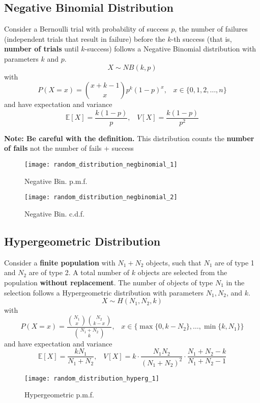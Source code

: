 \subsection{Negative Binomial Distribution}
Consider a Bernoulli trial with probability of success $p$, the number of failures (independent trials that result in failure) before the $k$-th success 
(that is, \textbf{number of trials} until $k$-success) follows a Negative Binomial distribution with parameters $k$ and $p$.
\[ X \sim NB(k,p)\]
with
\[ P(X=x) = \binom{x+k-1}{x} p^k(1-p)^x,\;\;\; x \in \{0,1,2,\dots,n\} \]
and have expectation and variance
\[ \mathbb{E}[X] = \frac{k(1-p)}{p},\;\;\; V[X] = \frac{k(1-p)}{p^2} \]

\textbf{Note: Be careful with the definition.} This distribution counts the \textbf{number of fails} not the number of fails + success
 
\begin{figure}[!ht]
    \begin{minipage}{0.45\linewidth}
      \texttt{[image: random\_distribution\_negbinomial\_1]}
      \caption{Negative Bin. p.m.f.}
    \end{minipage}
    \hfill
    \begin{minipage}{0.45\linewidth}
      \texttt{[image: random\_distribution\_negbinomial\_2]}
      \caption{Negative Bin. c.d.f.}
    \end{minipage}
\end{figure}

\subsection{Hypergeometric Distribution}
Consider a \textbf{finite population} with $N_1+N_2$ objects, such that $N_1$ are of type 1 and $N_2$ are of type 2. A total number of $k$
objects are selected from the population \textbf{without replacement}. The number of objects of type $N_1$ in the selection follows 
a Hypergeometric distribution with parameters $N_1, N_2$, and $k$.
\[ X \sim H(N_1,N_2,k)\]
with
\[ P(X=x) = \frac{\binom{N_1}{x}\binom{N_2}{k-x}}{\binom{N_1+N_2}{k}},\;\;\; x \in \{\max\{0,k-N_2\},\dots,\min\{k,N_1\} \} \]
and have expectation and variance
\[ \mathbb{E}[X] = \frac{kN_1}{N_1+N_2},\;\;\; V[X] = k\cdot\frac{N_1N_2}{(N_1+N_2)^2}\cdot\frac{N_1+N_2-k}{N_1+N_2-1} \]

\begin{figure}[!ht]
    \begin{center}
        \texttt{[image: random\_distribution\_hyperg\_1]}
        \caption{Hypergeometric p.m.f.}
    \end{center}
\end{figure}

